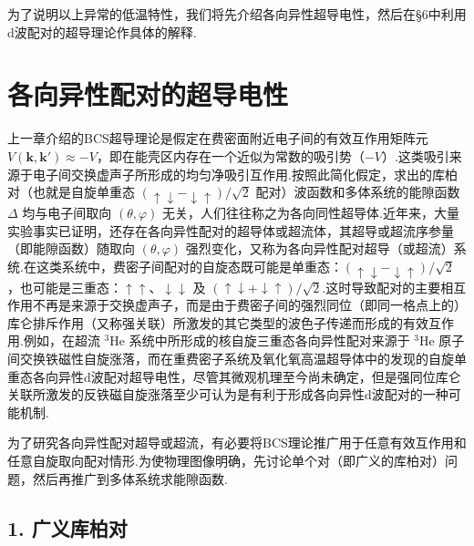 为了说明以上异常的低温特性，我们将先介绍各向异性超导电性，然后在§6中利用d波配对的超导理论作具体的解释.

\section{各向异性配对的超导电性}

上一章介绍的BCS超导理论是假定在费密面附近电子间的有效互作用矩阵元 $V\left(\boldsymbol{k},\boldsymbol{k}'\right)\approx-V$，即在能壳区内存在一个近似为常数的吸引势（$-V$）.这类吸引来源于电子间交换虚声子所形成的均匀净吸引互作用.按照此简化假定，求出的库柏对（也就是自旋单重态 $\left(\uparrow\downarrow-\downarrow\uparrow\right)/\sqrt{2}$ 配对）波函数和多体系统的能隙函数 $\Delta$ 均与电子间取向 $\left(\theta,\varphi\right)$ 无关，人们往往称之为各向同性超导体.近年来，大量实验事实已证明，还存在各向异性配对的超导体或超流体，其超导或超流序参量（即能隙函数）随取向 $\left(\theta,\varphi\right)$ 强烈变化，又称为各向异性配对超导（或超流）系统.在这类系统中，费密子间配对的自旋态既可能是单重态：$\left(\uparrow\downarrow-\downarrow\uparrow\right)/\sqrt{2}$，也可能是三重态：$\uparrow\uparrow$、$\downarrow\downarrow$ 及 $\left(\uparrow\downarrow+\downarrow\uparrow\right)/\sqrt{2}$.这时导致配对的主要相互作用不再是来源于交换虚声子，而是由于费密子间的强烈同位（即同一格点上的）库仑排斥作用（又称强关联）所激发的其它类型的波色子传递而形成的有效互作用.例如，在超流 $^{3}\mathrm{He}$ 系统中所形成的核自旋三重态各向异性配对来源于 $^{3}\mathrm{He}$ 原子间交换铁磁性自旋涨落，而在重费密子系统及氧化氧高温超导体中的发现的自旋单重态各向异性d波配对超导电性，尽管其微观机理至今尚未确定，但是强同位库仑关联所激发的反铁磁自旋涨落至少可认为是有利于形成各向异性d波配对的一种可能机制.

为了研究各向异性配对超导或超流，有必要将BCS理论推广用于任意有效互作用和任意自旋取向配对情形.为使物理图像明确，先讨论单个对（即广义的库柏对）问题，然后再推广到多体系统求能隙函数.

\subsection*{1. 广义库柏对}

